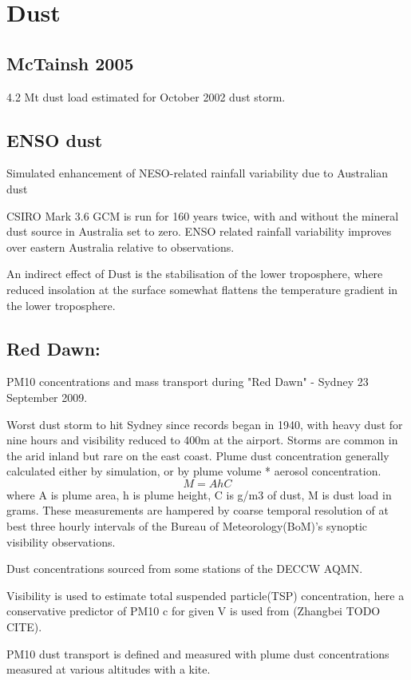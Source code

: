 \section{Dust}

\subsection{McTainsh 2005}
4.2 Mt dust load estimated for October 2002 dust storm.

\subsection{ENSO dust \cite{Rotstayn_2011}}
Simulated enhancement of NESO-related rainfall variability due to Australian dust

CSIRO Mark 3.6 GCM is run for 160 years twice, with and without the mineral dust source in Australia set to zero.
ENSO related rainfall variability improves over eastern Australia relative to observations.

An indirect effect of Dust is the stabilisation of the lower troposphere, where reduced insolation at the surface somewhat flattens the temperature gradient in the lower troposphere.

\subsection{Red Dawn: \cite{Leys_2011}}
PM10 concentrations and mass transport during "Red Dawn" - Sydney 23 September 2009.

Worst dust storm to hit Sydney since records began in 1940, with heavy dust for nine hours and visibility reduced to 400m at the airport.
Storms are common in the arid inland but rare on the east coast.
Plume dust concentration generally calculated either by simulation, or by plume volume * aerosol concentration.
$$M = AhC$$ 
where A is plume area, h is plume height, C is g/m3 of dust, M is dust load in grams.
These measurements are hampered by coarse temporal resolution of at best three hourly intervals of the Bureau of Meteorology(BoM)'s synoptic visibility observations.

Dust concentrations sourced from some stations of the DECCW AQMN.

Visibility is used to estimate total suspended particle(TSP) concentration, here a conservative predictor of PM10 c for given V is used from (Zhangbei TODO CITE).

PM10 dust transport is defined and measured with plume dust concentrations measured at various altitudes with a kite. 

